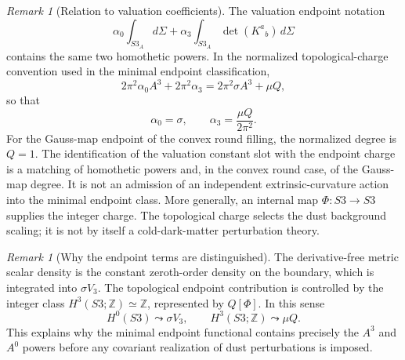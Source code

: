 \documentclass[11pt,a4paper]{article}
\def\Sthree{S3}%
\def\dd{d}%
\numberwithin{equation}{section}
\theoremstyle{remark}
\newtheorem{remark}[criterion]{Remark}
\newcommand{\Sthree}{S^3}
\newcommand{\dd}{\mathrm{d}}
\begin{document}
\begin{remark}[Relation to valuation coefficients]
The valuation endpoint notation
\begin{equation}
\alpha_0\int_{\Sthree_A}\dd\Sigma+
\alpha_3\int_{\Sthree_A}\det(K^a{}_b)\,\dd\Sigma
\end{equation}
contains the same two homothetic powers. In the normalized topological-charge convention used in the minimal endpoint classification,
\begin{equation}
2\pi^2\alpha_0A^3+2\pi^2\alpha_3
=2\pi^2\sigma A^3+\mu Q,
\end{equation}
so that
\begin{equation}
\alpha_0=\sigma,
\qquad
\alpha_3=\frac{\mu Q}{2\pi^2}.
\end{equation}
For the Gauss-map endpoint of the convex round filling, the normalized degree is \(Q=1\). The identification of the valuation constant slot with the endpoint charge is a matching of homothetic powers and, in the convex round case, of the Gauss-map degree. It is not an admission of an independent extrinsic-curvature action into the minimal endpoint class. More generally, an internal map \(\Phi:\Sthree\to\Sthree\) supplies the integer charge. The topological charge selects the dust background scaling; it is not by itself a cold-dark-matter perturbation theory.
\end{remark}

\begin{remark}[Why the endpoint terms are distinguished]
The derivative-free metric scalar density is the constant zeroth-order density on the boundary, which is integrated into \(\sigma V_3\). The topological endpoint contribution is controlled by the integer class \(H^3(\Sthree;\mathbb{Z})\simeq\mathbb{Z}\), represented by \(Q[\Phi]\). In this sense
\begin{equation}
H^0(\Sthree)\leadsto \sigma V_3,
\qquad
H^3(\Sthree;\mathbb{Z})\leadsto \mu Q.
\end{equation}
This explains why the minimal endpoint functional contains precisely the \(A^3\) and \(A^0\) powers before any covariant realization of dust perturbations is imposed.
\end{remark}
\end{document}
